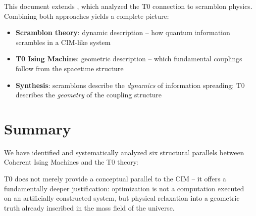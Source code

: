 This document extends \cite{pascher_scramblons_2026}, which analyzed the T0 connection
to scramblon physics. Combining both approaches yields a complete picture:

\begin{itemize}
    \item \textbf{Scramblon theory}: dynamic description -- how quantum information
    scrambles in a CIM-like system
    \item \textbf{T0 Ising Machine}: geometric description -- which fundamental
    couplings follow from the spacetime structure
    \item \textbf{Synthesis}: scramblons describe the \emph{dynamics} of information
    spreading; T0 describes the \emph{geometry} of the coupling structure
\end{itemize}

\clearpage

\section{Summary}
\label{sec:summary}

We have identified and systematically analyzed six structural parallels between
Coherent Ising Machines and the T0 theory:

\begin{table}[h]
    \centering
    \caption{Summary: Six parallels T0 $\leftrightarrow$ CIM}
    \label{tab:summary}
\end{table}

T0 does not merely provide a conceptual parallel to the CIM -- it offers a
fundamentally deeper justification: optimization is not a computation executed on an
artificially constructed system, but physical relaxation into a geometric truth already
inscribed in the mass field of the universe.

